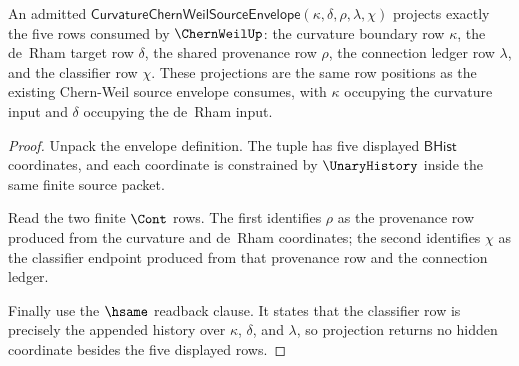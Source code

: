 \begin{theorem}
\label{thm:curvature-chernweil-source-envelope-readback}
An admitted $\mathsf{CurvatureChernWeilSourceEnvelope}(\kappa,\delta,\rho,\lambda,\chi)$ projects exactly the five rows consumed by $\ChernWeilUp$: the curvature boundary row $\kappa$, the de~Rham target row $\delta$, the shared provenance row $\rho$, the connection ledger row $\lambda$, and the classifier row $\chi$. These projections are the same row positions as the existing Chern-Weil source envelope consumes, with $\kappa$ occupying the curvature input and $\delta$ occupying the de~Rham input.
\end{theorem}
\begin{proof}
Unpack the envelope definition. The tuple has five displayed $\mathsf{BHist}$ coordinates, and each coordinate is constrained by $\UnaryHistory$ inside the same finite source packet.

Read the two finite $\Cont$ rows. The first identifies $\rho$ as the provenance row produced from the curvature and de~Rham coordinates; the second identifies $\chi$ as the classifier endpoint produced from that provenance row and the connection ledger.

Finally use the $\hsame$ readback clause. It states that the classifier row is precisely the appended history over $\kappa$, $\delta$, and $\lambda$, so projection returns no hidden coordinate besides the five displayed rows.
\end{proof}

